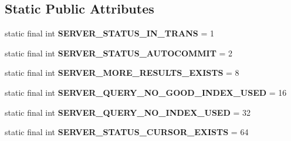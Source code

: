 \subsection*{Static Public Attributes}
\begin{DoxyCompactItemize}
\item 
\mbox{\label{classcom_1_1mysql_1_1cj_1_1protocol_1_1a_1_1_native_server_session_a2e17ad7ebafdf5c6ef09e26247c622e5}} 
static final int {\bfseries S\+E\+R\+V\+E\+R\+\_\+\+S\+T\+A\+T\+U\+S\+\_\+\+I\+N\+\_\+\+T\+R\+A\+NS} = 1
\item 
\mbox{\label{classcom_1_1mysql_1_1cj_1_1protocol_1_1a_1_1_native_server_session_a54c9bc32808c29e58e4c461bd82eea48}} 
static final int {\bfseries S\+E\+R\+V\+E\+R\+\_\+\+S\+T\+A\+T\+U\+S\+\_\+\+A\+U\+T\+O\+C\+O\+M\+M\+IT} = 2
\item 
\mbox{\label{classcom_1_1mysql_1_1cj_1_1protocol_1_1a_1_1_native_server_session_aea95769f892a5a920b4781c3a9d10251}} 
static final int {\bfseries S\+E\+R\+V\+E\+R\+\_\+\+M\+O\+R\+E\+\_\+\+R\+E\+S\+U\+L\+T\+S\+\_\+\+E\+X\+I\+S\+TS} = 8
\item 
\mbox{\label{classcom_1_1mysql_1_1cj_1_1protocol_1_1a_1_1_native_server_session_aac04442bd02687292134ab604f5d6df7}} 
static final int {\bfseries S\+E\+R\+V\+E\+R\+\_\+\+Q\+U\+E\+R\+Y\+\_\+\+N\+O\+\_\+\+G\+O\+O\+D\+\_\+\+I\+N\+D\+E\+X\+\_\+\+U\+S\+ED} = 16
\item 
\mbox{\label{classcom_1_1mysql_1_1cj_1_1protocol_1_1a_1_1_native_server_session_a40dd6773d6bdaeb065e4c24aa7973f84}} 
static final int {\bfseries S\+E\+R\+V\+E\+R\+\_\+\+Q\+U\+E\+R\+Y\+\_\+\+N\+O\+\_\+\+I\+N\+D\+E\+X\+\_\+\+U\+S\+ED} = 32
\item 
\mbox{\label{classcom_1_1mysql_1_1cj_1_1protocol_1_1a_1_1_native_server_session_a4d5dd4d793a3f237f6c28ac077b6e4be}} 
static final int {\bfseries S\+E\+R\+V\+E\+R\+\_\+\+S\+T\+A\+T\+U\+S\+\_\+\+C\+U\+R\+S\+O\+R\+\_\+\+E\+X\+I\+S\+TS} = 64

\end{DoxyCompactItemize}
